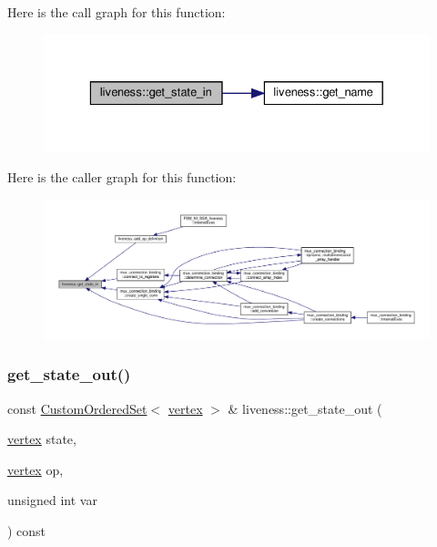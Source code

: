 Here is the call graph for this function\+:
\nopagebreak
\begin{figure}[H]
\begin{center}
\leavevmode
\includegraphics[width=329pt]{d3/d1f/classliveness_a9f9d674ef6387aa8c82d444fe2540ed5_cgraph}
\end{center}
\end{figure}
Here is the caller graph for this function\+:
\nopagebreak
\begin{figure}[H]
\begin{center}
\leavevmode
\includegraphics[width=350pt]{d3/d1f/classliveness_a9f9d674ef6387aa8c82d444fe2540ed5_icgraph}
\end{center}
\end{figure}
\mbox{\label{classliveness_acba3b65c03d0608cec1c4c1d5ed79aa6}} 
\subsubsection{\texorpdfstring{get\+\_\+state\+\_\+out()}{get\_state\_out()}}
{\footnotesize\ttfamily const \hyperlink{classCustomOrderedSet}{Custom\+Ordered\+Set}$<$ \hyperlink{graph_8hpp_abefdcf0544e601805af44eca032cca14}{vertex} $>$ \& liveness\+::get\+\_\+state\+\_\+out (\begin{DoxyParamCaption}\item[{\hyperlink{graph_8hpp_abefdcf0544e601805af44eca032cca14}{vertex}}]{state,  }\item[{\hyperlink{graph_8hpp_abefdcf0544e601805af44eca032cca14}{vertex}}]{op,  }\item[{unsigned int}]{var }\end{DoxyParamCaption}) const}



